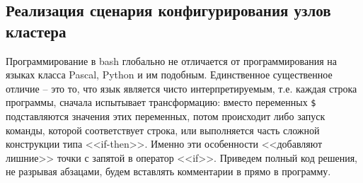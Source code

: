 \documentclass[12pt]{article}
\begin{document}
\subsection{Реализация сценария конфигурирования узлов кластера}
Программирование в bash глобально не отличается от программирования на языках класса Pascal, Python и им подобным. Единственное существенное отличие -- это то, что язык является чисто интерпретируемым, т.е. каждая строка программы, сначала испытывает трансформацию: вместо переменных \texttt{\$<имя переменной>} подставляются значения этих переменных, потом происходит либо запуск команды, которой соответствует строка, или выполняется часть сложной конструкции типа <<if-then>>. Именно эти особенности <<добавляют лишние>> точки с запятой в оператор <<if>>. Приведем полный код решения, не разрывая абзацами, будем вставлять комментарии в прямо в программу.
\end{document}
